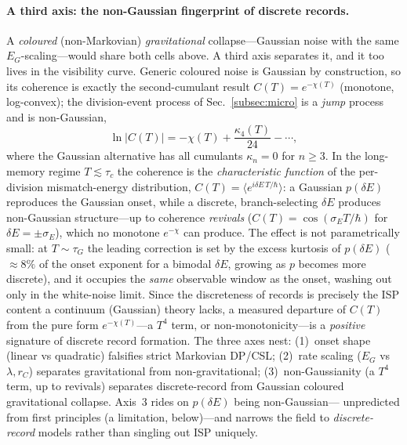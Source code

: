 \documentclass[aps,prd,onecolumn,amsmath,amssymb,nofootinbib,superscriptaddress]{revtex4-2}
\begin{document}
\paragraph{A third axis: the non-Gaussian fingerprint of discrete records.} A \emph{coloured}
(non-Markovian) \emph{gravitational} collapse---Gaussian noise with the same $E_G$-scaling---would
share both cells above. A third axis separates it, and it too lives in the visibility curve. Generic
coloured noise is Gaussian by construction, so its coherence is exactly the second-cumulant result
$C(T)=e^{-\chi(T)}$ (monotone, log-convex); the division-event process of Sec.~\ref{subsec:micro} is a
\emph{jump} process and is non-Gaussian,
\begin{equation}
\ln|C(T)|=-\chi(T)+\frac{\kappa_4(T)}{24}-\cdots,
\end{equation}
where the Gaussian alternative has all cumulants $\kappa_n=0$ for $n\ge3$. In the long-memory regime
$T\lesssim\tau_c$ the coherence is the \emph{characteristic function} of the per-division
mismatch-energy distribution, $C(T)=\langle e^{i\delta E\,T/\hbar}\rangle$: a Gaussian $p(\delta E)$
reproduces the Gaussian onset, while a discrete, branch-selecting $\delta E$ produces non-Gaussian
structure---up to coherence \emph{revivals} ($C(T)=\cos(\sigma_E T/\hbar)$ for $\delta E=\pm\sigma_E$),
which no monotone $e^{-\chi}$ can produce. The effect is not parametrically small: at $T\sim\tau_G$ the
leading correction is set by the excess kurtosis of $p(\delta E)$ ($\approx8\%$ of the onset exponent
for a bimodal $\delta E$, growing as $p$ becomes more discrete), and it occupies the \emph{same}
observable window as the onset, washing out only in the white-noise limit. Since the discreteness of
records is precisely the ISP content a continuum (Gaussian) theory lacks, a measured departure of
$C(T)$ from the pure form $e^{-\chi(T)}$---a $T^4$ term, or non-monotonicity---is a \emph{positive}
signature of discrete record formation. The three axes nest: (1)~onset shape (linear vs quadratic)
falsifies strict Markovian DP/CSL; (2)~rate scaling ($E_G$ vs $\lambda,r_C$) separates gravitational
from non-gravitational; (3)~non-Gaussianity (a $T^4$ term, up to revivals) separates discrete-record
from Gaussian coloured gravitational collapse. Axis~3 rides on $p(\delta E)$ being non-Gaussian---
unpredicted from first principles (a limitation, below)---and narrows the field to
\emph{discrete-record} models rather than singling out ISP uniquely.
\end{document}
